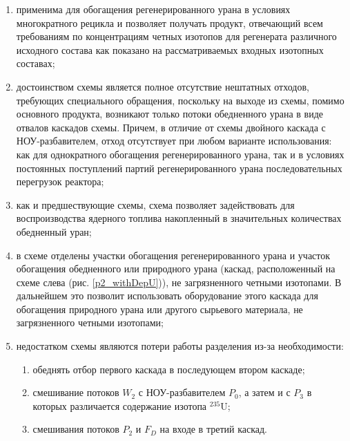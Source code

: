 \begin{enumerate}
    \item применима для обогащения регенерированного урана в условиях многократного рецикла и позволяет получать продукт, отвечающий всем требованиям по концентрациям четных изотопов для регенерата различного исходного состава как показано на рассматриваемых входных изотопных составах;
    \item достоинством схемы является полное отсутствие нештатных отходов, требующих специального обращения, поскольку на выходе из схемы, помимо основного продукта, возникают только потоки обедненного урана в виде отвалов каскадов схемы. Причем, в отличие от схемы двойного каскада с НОУ-разбавителем, отход отсутствует при любом варианте использования: как для однократного обогащения регенерированного урана, так и в условиях постоянных поступлений партий регенерированного урана последовательных перегрузок реактора;
    \item как и предшествующие схемы, схема позволяет задействовать для воспроизводства ядерного топлива накопленный в значительных количествах обедненный уран;
    \item в схеме отделены участки обогащения регенерированного урана и участок обогащения обедненного или природного урана (каскад, расположенный на схеме слева (рис. 
    \ref{p2_withDepU})), не загрязненного четными изотопами. В дальнейшем это позволит использовать оборудование этого каскада для обогащения природного урана или другого сырьевого материала, не загрязненного четными изотопами;
    \item недостатком схемы являются потери работы разделения из-за необходимости:
    \begin{enumerate}
        \item обеднять отбор первого каскада в последующем втором каскаде;
        \item смешивание потоков $W_2$ с НОУ-разбавителем $P_0$, а затем и с $P_3$ в которых различается содержание изотопа $^{235}$U;
        \item смешивания потоков $P_2$ и $F_D$ на входе в третий каскад.
    \end{enumerate}
\end{enumerate}


